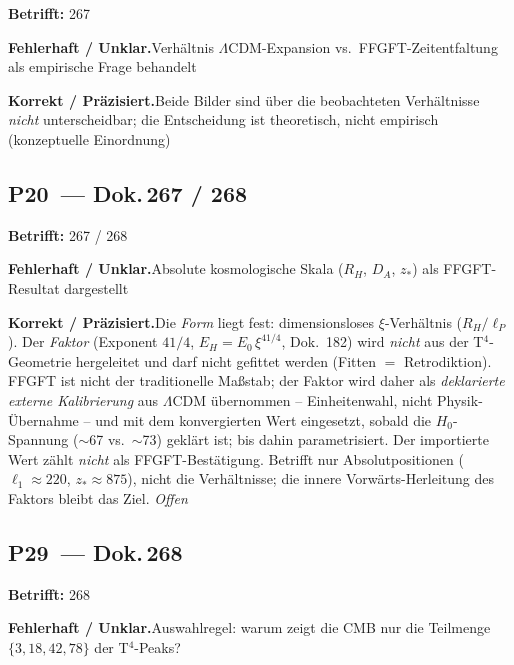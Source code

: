 \noindent\textbf{Betrifft:} 267


\smallskip\noindent\textbf{Fehlerhaft / Unklar.}\quad Verhältnis $\Lambda$CDM-Expansion vs.\ FFGFT-Zeitentfaltung als empirische Frage behandelt


\smallskip\noindent\textbf{Korrekt / Präzisiert.}\quad Beide Bilder sind über die beobachteten Verhältnisse \emph{nicht} unterscheidbar; die Entscheidung ist theoretisch, nicht empirisch (konzeptuelle Einordnung)


\medskip


\subsection*{P20~--- Dok.\,267 / 268}

\noindent\textbf{Betrifft:} 267 / 268


\smallskip\noindent\textbf{Fehlerhaft / Unklar.}\quad Absolute kosmologische Skala ($R_H$, $D_A$, $z_*$) als FFGFT-Resultat dargestellt


\smallskip\noindent\textbf{Korrekt / Präzisiert.}\quad Die \emph{Form} liegt fest: dimensionsloses $\xi$-Verhältnis ($R_H/\ell_P$). Der \emph{Faktor} (Exponent $41/4$, $E_H = E_0\,\xi^{41/4}$, Dok.~182) wird \emph{nicht} aus der T$^4$-Geometrie hergeleitet und darf nicht gefittet werden (Fitten $=$ Retrodiktion). FFGFT ist nicht der traditionelle Maßstab; der Faktor wird daher als \emph{deklarierte externe Kalibrierung} aus $\Lambda$CDM übernommen -- Einheitenwahl, nicht Physik-Übernahme -- und mit dem konvergierten Wert eingesetzt, sobald die $H_0$-Spannung ($\sim$67 vs.\ $\sim$73) geklärt ist; bis dahin parametrisiert. Der importierte Wert zählt \emph{nicht} als FFGFT-Bestätigung. Betrifft nur Absolutpositionen ($\ell_1\approx220$, $z_*\approx875$), nicht die Verhältnisse; die innere Vorwärts-Herleitung des Faktors bleibt das Ziel. \emph{Offen}


\medskip


\subsection*{P29~--- Dok.\,268}

\noindent\textbf{Betrifft:} 268


\smallskip\noindent\textbf{Fehlerhaft / Unklar.}\quad Auswahlregel: warum zeigt die CMB nur die Teilmenge $\{3,18,42,78\}$ der T$^4$-Peaks?


